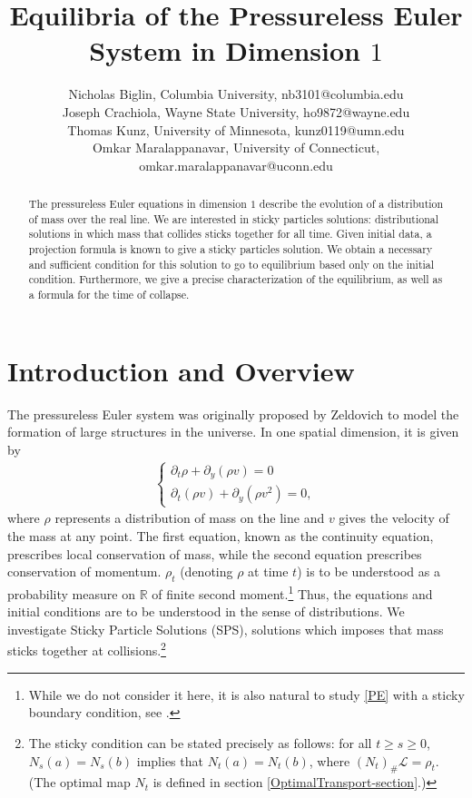 \documentclass[11pt]{article}
\title{Equilibria of the Pressureless Euler System in Dimension $1$}
\author{Nicholas Biglin, Columbia University, nb3101@columbia.edu \\ Joseph Crachiola, Wayne State University, ho9872@wayne.edu\\ Thomas Kunz, University of Minnesota, kunz0119@umn.edu \\Omkar Maralappanavar, University of Connecticut, omkar.maralappanavar@uconn.edu}
\date{}
\numberwithin{equation}{section}
\begin{document}
\maketitle

\singlespacing
\begin{abstract}
    The pressureless Euler equations in dimension $1$ describe the evolution of a distribution of mass over the real line. We are interested in sticky particles solutions: distributional solutions in which mass that collides sticks together for all time. Given initial data, a projection formula is known to give a sticky particles solution. We obtain a necessary and sufficient condition for this solution to go to equilibrium based only on the initial condition. Furthermore, we give a precise characterization of the equilibrium, as well as a formula for the time of collapse.  
\end{abstract}

\doublespacing

\section{Introduction and Overview}\label{Overview}
    The pressureless Euler system was originally proposed by Zeldovich \cite{Zeldovich} to model the formation of large structures in the universe. In one spatial dimension, it is given by 
    \begin{align}
        \begin{cases}\label{PE}\tag{PE}
        \partial_t \rho + \partial_y (\rho v) = 0 
        \\
        \partial_t (\rho v) + \partial_y (\rho v^2) = 0,
        \end{cases}
    \end{align}
    where $\rho$ represents a distribution of mass on the line and $v$ gives the velocity of the mass at any point. The first equation, known as the continuity equation, prescribes local conservation of mass, while the second equation prescribes conservation of momentum. $\rho_t$ (denoting $\rho$ at time $t$) is to be understood as a probability measure on $\mathbb{R}$ of finite second moment.\footnote{While we do not consider it here, it is also natural to study \eqref{PE} with a sticky boundary condition, see \cite{Tudorascu2023}.}
    Thus, the equations and initial conditions are to be understood in the sense of distributions. We investigate Sticky Particle Solutions (SPS), solutions which imposes that mass sticks together at collisions.\footnote{The sticky condition can be stated precisely as follows: for all $t\geq s\geq0$, $N_s(a)=N_s(b)$ implies that $N_t(a)=N_t(b)$, where $(N_t)_\#\mathcal{L}=\rho_t$. (The optimal map $N_t$ is defined in section \ref{OptimalTransport-section}.)}
\end{document}
